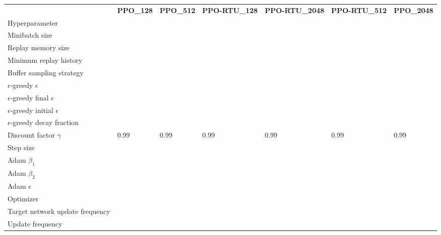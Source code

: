\begin{tabular}{lllllll}
 & \bfseries PPO_128 & \bfseries PPO_512 & \bfseries PPO-RTU_128 & \bfseries PPO-RTU_2048 & \bfseries PPO-RTU_512 & \bfseries PPO_2048 \\
Hyperparameter &  &  &  &  &  &  \\
Minibatch size &  &  &  &  &  &  \\
Replay memory size &  &  &  &  &  &  \\
Minimum replay history &  &  &  &  &  &  \\
Buffer sampling strategy &  &  &  &  &  &  \\
$\epsilon$-greedy $\epsilon$ &  &  &  &  &  &  \\
$\epsilon$-greedy final $\epsilon$ &  &  &  &  &  &  \\
$\epsilon$-greedy initial $\epsilon$ &  &  &  &  &  &  \\
$\epsilon$-greedy decay fraction &  &  &  &  &  &  \\
Discount factor $\gamma$ & 0.99 & 0.99 & 0.99 & 0.99 & 0.99 & 0.99 \\
Step size &  &  &  &  &  &  \\
Adam $\beta_1$ &  &  &  &  &  &  \\
Adam $\beta_2$ &  &  &  &  &  &  \\
Adam $\epsilon$ &  &  &  &  &  &  \\
Optimizer &  &  &  &  &  &  \\
Target network update frequency &  &  &  &  &  &  \\
Update frequency &  &  &  &  &  &  \\
\end{tabular}
